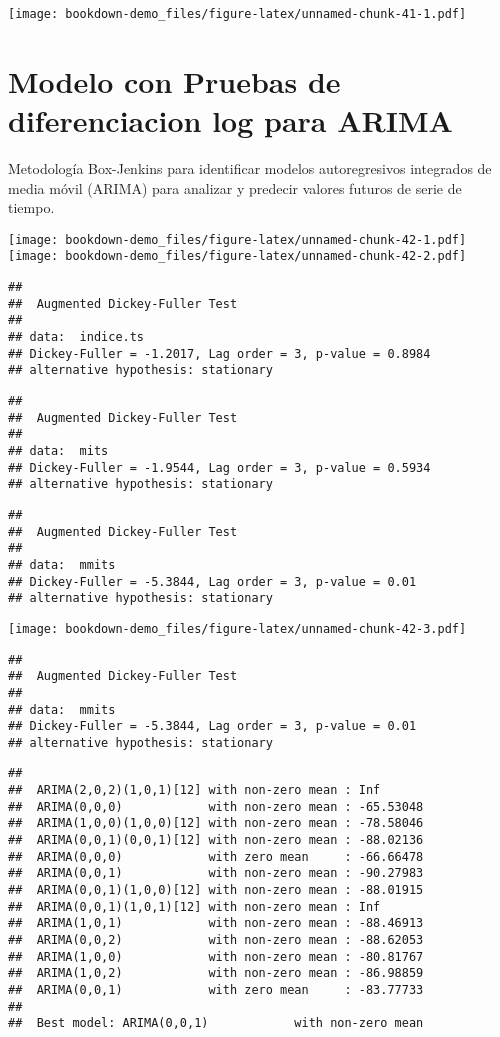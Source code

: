 \documentclass[
]{book}
\begin{document}
\texttt{[image: bookdown-demo\_files/figure-latex/unnamed-chunk-41-1.pdf]}

\hypertarget{modelo-con-pruebas-de-diferenciacion-log-para-arima}{%
\chapter{Modelo con Pruebas de diferenciacion log para ARIMA}\label{modelo-con-pruebas-de-diferenciacion-log-para-arima}}

Metodología Box-Jenkins para identificar modelos autoregresivos integrados de media móvil (ARIMA) para analizar y predecir valores futuros de serie de tiempo.

\texttt{[image: bookdown-demo\_files/figure-latex/unnamed-chunk-42-1.pdf]} \texttt{[image: bookdown-demo\_files/figure-latex/unnamed-chunk-42-2.pdf]}

\begin{verbatim}
## 
##  Augmented Dickey-Fuller Test
## 
## data:  indice.ts
## Dickey-Fuller = -1.2017, Lag order = 3, p-value = 0.8984
## alternative hypothesis: stationary
\end{verbatim}

\begin{verbatim}
## 
##  Augmented Dickey-Fuller Test
## 
## data:  mits
## Dickey-Fuller = -1.9544, Lag order = 3, p-value = 0.5934
## alternative hypothesis: stationary
\end{verbatim}

\begin{verbatim}
## 
##  Augmented Dickey-Fuller Test
## 
## data:  mmits
## Dickey-Fuller = -5.3844, Lag order = 3, p-value = 0.01
## alternative hypothesis: stationary
\end{verbatim}

\texttt{[image: bookdown-demo\_files/figure-latex/unnamed-chunk-42-3.pdf]}

\begin{verbatim}
## 
##  Augmented Dickey-Fuller Test
## 
## data:  mmits
## Dickey-Fuller = -5.3844, Lag order = 3, p-value = 0.01
## alternative hypothesis: stationary
\end{verbatim}

\begin{verbatim}
## 
##  ARIMA(2,0,2)(1,0,1)[12] with non-zero mean : Inf
##  ARIMA(0,0,0)            with non-zero mean : -65.53048
##  ARIMA(1,0,0)(1,0,0)[12] with non-zero mean : -78.58046
##  ARIMA(0,0,1)(0,0,1)[12] with non-zero mean : -88.02136
##  ARIMA(0,0,0)            with zero mean     : -66.66478
##  ARIMA(0,0,1)            with non-zero mean : -90.27983
##  ARIMA(0,0,1)(1,0,0)[12] with non-zero mean : -88.01915
##  ARIMA(0,0,1)(1,0,1)[12] with non-zero mean : Inf
##  ARIMA(1,0,1)            with non-zero mean : -88.46913
##  ARIMA(0,0,2)            with non-zero mean : -88.62053
##  ARIMA(1,0,0)            with non-zero mean : -80.81767
##  ARIMA(1,0,2)            with non-zero mean : -86.98859
##  ARIMA(0,0,1)            with zero mean     : -83.77733
## 
##  Best model: ARIMA(0,0,1)            with non-zero mean
\end{verbatim}
\end{document}
